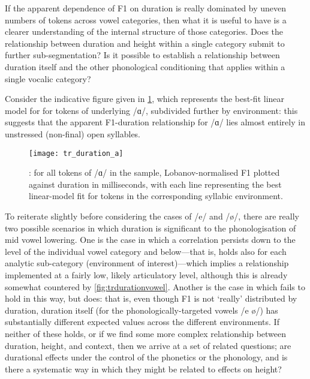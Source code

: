 If the apparent dependence of F1 on duration is really dominated by uneven numbers of tokens across vowel categories, then what it is useful to have is a clearer understanding of the internal structure of those categories. Does the relationship between duration and height within a single category submit to further sub-segmentation? Is it possible to establish a relationship between duration itself and the other phonological conditioning that applies within a single vocalic category?

Consider the indicative figure given in \cref{fig:trdurationa}, which represents the best-fit linear model for  for tokens of underlying /ɑ/, subdivided further by environment: this suggests that the apparent F1-duration relationship for /ɑ/ lies almost entirely in unstressed (non-final) open syllables.

\begin{figure}[H]
  \centering
  \texttt{[image: tr\_duration\_a]}
  \caption[ correlation for /ɑ/, split by environment.]{: for all tokens of /ɑ/ in the sample, Lobanov-normalised F1 plotted against duration in milliseconds, with each line representing the best linear-model fit for tokens in the corresponding syllabic environment.}
  \label{fig:trdurationa}
\end{figure}

To reiterate slightly before considering the cases of /e/ and /ø/, there are really two possible scenarios in which duration is significant to the phonologisation of mid vowel lowering. One is the case in which a  correlation persists down to the level of the individual vowel category and below---that is, holds also for each analytic sub-category (environment of interest)---which implies a relationship implemented at a fairly low, likely articulatory level, although this is already somewhat countered by \cref{fig:trdurationvowel}. Another is the case in which  fails to hold in this way, but  does: that is, even though F1 is not `really' distributed by duration, duration itself (for the phonologically-targeted vowels /e ø/) has substantially different expected values across the different environments. If neither of these holds, or if we find some more complex relationship between duration, height, and context, then we arrive at a set of related questions; are durational effects under the control of the phonetics or the phonology, and is there a systematic way in which they might be related to effects on height?

